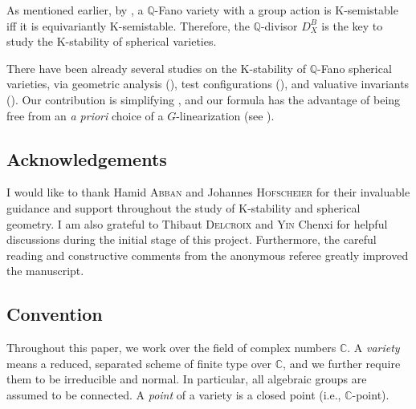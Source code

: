 As mentioned earlier, by \cite{Zhuang_equi_Kst}, a $\mathbb{Q}$-Fano variety with a group action is K-semistable iff it is equivariantly K-semistable. Therefore, the $\mathbb{Q}$-divisor $D^B_X$ is the key to study the K-stability of spherical varieties.

There have been already several studies on the K-stability of $\mathbb{Q}$-Fano spherical varieties, via geometric analysis (\cite{Delcroix_Kst_Fano_spher}), test configurations (\cite{LLW_wei_Kst_Fano_sph}), and valuative invariants (\cite{Yin_valu_lin_sph}). Our contribution is simplifying \cite[Theorem 4.1]{Yin_valu_lin_sph}, and our formula has the advantage of being free from an \textit{a priori} choice of a $G$-linearization (see ).

\subsection*{Acknowledgements}
I would like to thank Hamid \textsc{Abban} and Johannes \textsc{Hofscheier} for their invaluable guidance and support throughout the study of K-stability and spherical geometry. I am also grateful to Thibaut \textsc{Delcroix} and \textsc{Yin} Chenxi for helpful discussions during the initial stage of this project. Furthermore, the careful reading and constructive comments from the anonymous referee greatly improved the manuscript.

\subsection*{Convention}
Throughout this paper, we work over the field of complex numbers $\mathbb{C}$. A \emph{variety} means a reduced, separated scheme of finite type over $\mathbb{C}$, and we further require them to be irreducible and normal. In particular, all algebraic groups are assumed to be connected.
% 
A \emph{point} of a variety is a closed point (i.e., $\mathbb{C}$-point).
